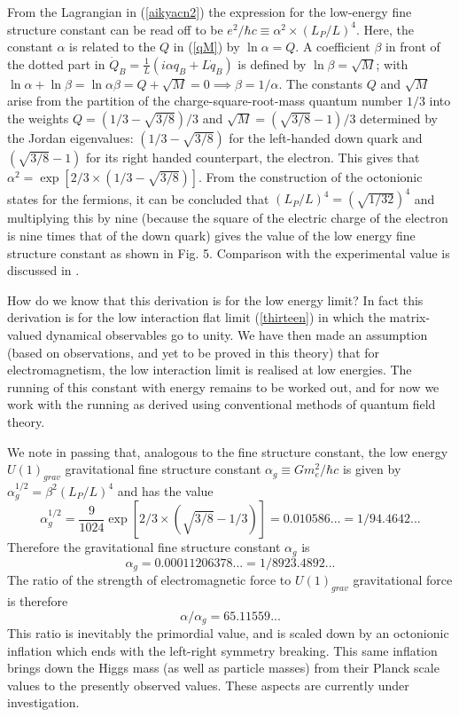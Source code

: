 \documentclass[a4paper]{jpconf}
\begin{document}
From the Lagrangian in (\ref{aikyacn2}) the expression for the low-energy fine structure constant can be read off to be $e^2/\hbar c \equiv \alpha^2 \times (L_P/L)^4$. Here, the constant $\alpha$ is related to the $Q$ in (\ref{qM}) by $\ln \alpha = Q$. A coefficient $\beta$ in front of the dotted part in ${\dot{{Q}}_B} = \frac{1}{L} (i\alpha q_B + L \dot{q}_B)$ is defined by $\ln\beta=\sqrt M$; with $\ln\alpha + \ln\beta = \ln \alpha\beta =Q+\sqrt M = 0 \implies \beta = 1/\alpha$. The constants $Q$ and $\sqrt{M}$ arise from the partition of the charge-square-root-mass quantum number $1/3$ into the weights $Q= (1/3 - \sqrt{3/8})/3$ and $\sqrt{M} = (\sqrt{3/8}-1)/3$ determined by the Jordan eigenvalues: $(1/3-\sqrt{3/8})$ for the left-handed down quark and $(\sqrt{3/8}-1)$ for its right handed counterpart, the electron.  This gives that $\alpha^2 = \exp [ 2/3 \times (1/3 - \sqrt{3/8})]$. From the construction of the octonionic states for the fermions, it can be concluded that \cite{Singhfsc} $(L_P/L)^4 = (\sqrt{1/32})^4$ and multiplying this by nine (because the square of the electric charge of the electron is nine times that of the down quark) gives the value of the low energy fine structure constant as shown in Fig. 5. Comparison with the experimental value is discussed in \cite{Singhfsc}. 

How do we know that this derivation is for the low energy limit? In fact this derivation is for the low interaction flat limit (\ref{thirteen}) in which the matrix-valued dynamical observables go to unity. We have then made an assumption (based on observations, and yet to be proved in this theory) that for electromagnetism, the low interaction limit is realised at low energies. The running of this constant with energy remains to be worked out, and for now we work with the running as derived using conventional methods of quantum field theory.

We note in passing that, analogous to the fine structure constant, the low energy $U(1)_{grav}$ gravitational fine structure constant $\alpha_g\equiv Gm_e^2/\hbar c$ is given by $\alpha_g^{1/2}=\beta^2 (L_P/L)^4$ and has the value
\begin{equation}
\alpha_g^{1/2} = \frac{9}{1024} \exp [ 2/3 \times (\sqrt{3/8} - 1/3) ] = 0.010586... = 1/94.4642...
\end{equation}
Therefore the gravitational fine structure constant $\alpha_g$ is
\begin{equation}
\alpha_g = 0.00011206378... = 1/8923.4892...
\end{equation}
The ratio of the strength of electromagnetic force to $U(1)_{grav}$ gravitational force is therefore
\begin{equation}
\alpha / \alpha_g = 65.11559...
\end{equation} 
This ratio is inevitably the primordial value, and is scaled down by an octonionic inflation which ends with the left-right symmetry breaking. This same inflation brings down the Higgs mass (as well as particle masses) from their Planck scale values to the presently observed values. These aspects are currently under investigation. 
\end{document}
